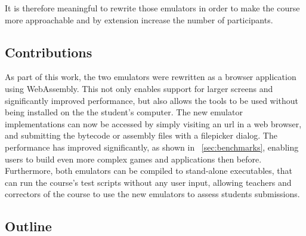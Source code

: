 It is therefore meaningful to rewrite those emulators in order to make the course more approachable and by extension increase the number of participants.

\subsection{Contributions}

As part of this work, the two emulators were rewritten as a browser application using WebAssembly. This not only enables support for larger screens and significantly improved performance, but also allows the tools to be used without being installed on the the student's computer.
The new emulator implementations can now be accessed by simply visiting an url in a web browser, and submitting the bytecode or assembly files with a filepicker dialog. The performance has improved significantly, as shown in ~\cref{sec:benchmarks}, enabling users to build even more complex games and applications then before.
Furthermore, both emulators can be compiled to stand-alone executables, that can run the course's test scripts without any user input, allowing teachers and correctors of the course to use the new emulators to assess students submissions.

\subsection{Outline}
